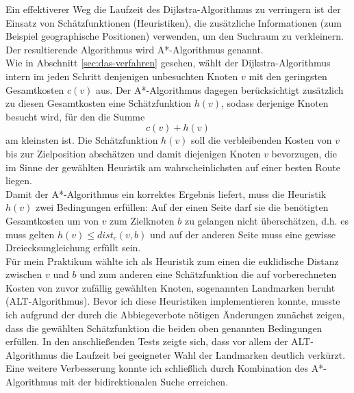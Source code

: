 \documentclass[a4paper]{scrartcl}
\begin{document}
Ein effektiverer Weg die Laufzeit des Dijkstra-Algorithmus zu verringern ist der Einsatz von Schätzfunktionen (Heuristiken), die zusätzliche Informationen (zum Beispiel geographische Positionen)  verwenden, um den Suchraum zu verkleinern. Der resultierende Algorithmus wird A*-Algorithmus genannt.\\
Wie in Abschnitt \ref{sec:das-verfahren} gesehen, wählt der Dijkstra-Algorithmus intern im jeden Schritt denjenigen unbesuchten Knoten $v$ mit den geringsten Gesamtkosten $c(v)$ aus. Der A*-Algorithmus dagegen berücksichtigt zusätzlich zu diesen Gesamtkosten eine Schätzfunktion $h(v)$, sodass derjenige Knoten besucht wird, für den die Summe 
\begin{equation}
  \label{eq:1}
  c(v) + h(v)   
\end{equation}
am kleinsten ist. Die Schätzfunktion $h(v)$ soll die verbleibenden Kosten von $v$ bis zur Zielposition abschätzen und damit diejenigen Knoten $v$ bevorzugen, die im Sinne der gewählten Heuristik am wahrscheinlichsten auf einer besten Route liegen. \\
Damit der A*-Algorithmus ein korrektes Ergebnis liefert, muss die Heuristik $h(v)$ zwei Bedingungen erfüllen: Auf der einen Seite darf sie die benötigten Gesamtkosten um von $v$ zum Zielknoten $b$ zu gelangen nicht überschätzen, d.h. es muss gelten $h(v) \leq dist_c(v,b)$ und auf der anderen Seite muss eine gewisse Dreiecksungleichung erfüllt sein. \\
Für mein Praktikum wählte ich als Heuristik zum einen die euklidische Distanz zwischen $v$ und $b$ und zum anderen eine Schätzfunktion die auf vorberechneten Kosten von zuvor zufällig gewählten Knoten, sogenannten Landmarken beruht (ALT-Algorithmus).  
Bevor ich diese Heuristiken implementieren konnte, musste ich aufgrund der durch die Abbiegeverbote nötigen Änderungen zunächst zeigen, dass die gewählten Schätzfunktion die beiden oben genannten Bedingungen erfüllen.  In den anschließenden Tests zeigte sich, dass vor allem der ALT-Algorithmus die Laufzeit bei geeigneter Wahl der Landmarken deutlich verkürzt. Eine weitere Verbesserung konnte ich schließlich durch Kombination des A*-Algorithmus mit der bidirektionalen Suche erreichen. 

\end{document}
